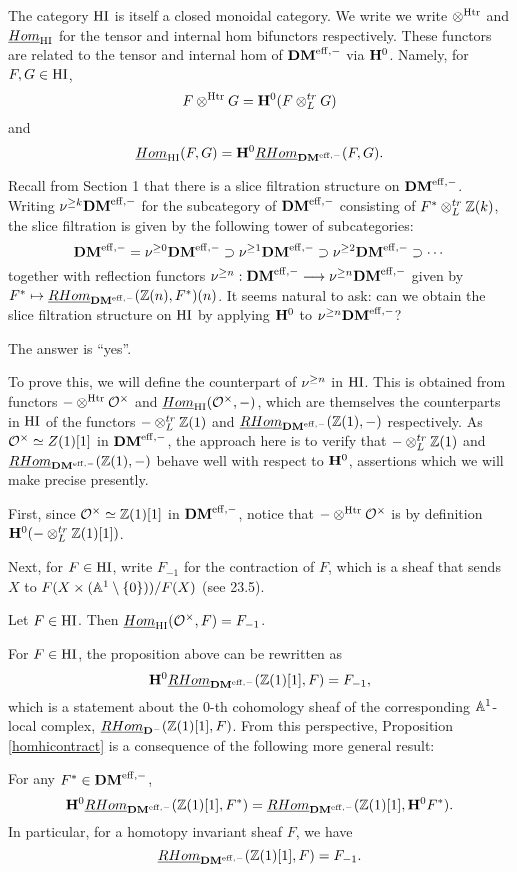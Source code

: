 The category $\HI$ is itself a closed monoidal category. We write 
we write $\tHI$ and $\ihomHI$ for the tensor and internal hom 
bifunctors respectively. These functors are related to the tensor 
and internal hom of $\DMm$ via $\H^0$. Namely, for $F, G \in \HI$,
\[
F \tHI G = \H^0(F \tDM G)
\] 
and 
\[
\ihomHI(F, G) = \H^0\rhomDM(F, G).
\]

Recall from \cite{HuKa} Section 1 that there is a slice 
filtration structure on $\DMm$. Writing $\slice{\geq k}\DMm$ for 
the subcategory of $\DMm$ consisting of $F^* \tDM \Z(k)$, the 
slice filtration is given by the following tower of subcategories: 
\[
\DMm = \slice{\geq 0}\DMm \supset \slice{\geq 1}\DMm
\supset \slice{\geq 2}\DMm \supset \cdots
\]
together with reflection functors $\slice{\geq n}: \DMm 
\longrightarrow \slice{\geq n}\DMm$ given by $F^* \mapsto 
\rhomDM(\Z(n), F^*)(n)$. It seems natural to ask: can we obtain 
the slice filtration structure on $\HI$ by applying $\H^0$ to 
$\slice{\geq n} \DMm$? 

The answer is ``yes''.

To prove this, we will define the counterpart of $\slice{\geq n}$ 
in $\HI$. This is obtained from functors $-\tHI\Ox$ and 
$\ihomHI(\Ox, -)$, which are themselves the counterparts in
$\HI$ of the functors $-\tDM\Z(1)$ and $\rhomDM(\Z(1), -)$ 
respectively. As $\Ox \simeq Z(1)[1]$ in $\DMm$, the approach 
here is to verify that $-\tDM\Z(1)$ and $\rhomDM(\Z(1), -)$ 
behave well with respect to $\H^0$, assertions which we will make 
precise presently.

First, since $\Ox \simeq \Z(1)[1]$ in $\DMm$, notice that $-\tHI \Ox$
is by definition $\H^0(-\tDM \Z(1)[1])$. 

Next, for $F \in \HI$, write $F_{-1}$ for the contraction of $F$,
which is a sheaf that sends $X$ to $F(X \times (\Gm))/F(X)$
(see \cite{MVW} 23.5). 

\begin{prop}\label{homhicontract}
Let $F \in \HI$. Then $\ihomHI(\Ox, F) = F_{-1}$.
\end{prop}

For $F \in \HI$, the proposition above can be rewritten as 
\[
\H^0\rhomDM(\Z(1)[1], F) = F_{-1},
\] 
which is a statement about the 0-th cohomology sheaf 
of the corresponding $\A^1$-local complex, $\rhom(\Z(1)[1], F)$.
From this perspective, Proposition \ref{homhicontract} is a
consequence of the following more general result:

\begin{lem}\label{homhi}
For any $F^* \in \DMm$,
\[
\H^0\rhomDM(\Z(1)[1], F^*) = \rhomDM(\Z(1)[1],  \H^0F^*).
\]
In particular, for a homotopy invariant sheaf $F$, 
we have 
\[
\rhomDM(\Z(1)[1], F) = F_{-1}.
\]
\end{lem}

